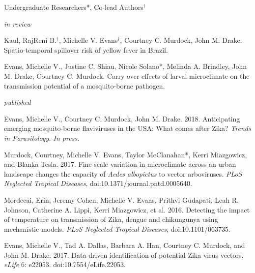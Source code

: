 


\bigskip
Undergraduate Researchers*, Co-lead Authors$^\dagger$

\smallskip
\textit{in review}
\smallskip

\begin{cvitems}

\item Kaul, RajReni B.$^\dagger$, \textcolor{awesome}{Michelle V. Evans}$^\dagger$, Courtney C. Murdock, John M. Drake. Spatio-temporal spillover risk of yellow fever in Brazil.
\smallskip

\item \textcolor{awesome}{Evans, Michelle V.}, Justine C. Shiau, Nicole Solano*, Melinda A. Brindley, John M. Drake, Courtney C. Murdock. Carry-over effects of larval microclimate on the transmission potential of a mosquito-borne pathogen.

\end{cvitems}

\bigskip
\textit{published}
\smallskip

\begin{etaremune}

\item \textcolor{awesome}{Evans, Michelle V.}, Courtney C. Murdock, John M. Drake. 2018. Anticipating emerging mosquito-borne flaviviruses in the USA: What comes after Zika? \textit{Trends in Parasitology. In press.}

\item Murdock, Courtney, \textcolor{awesome}{Michelle V. Evans}, Taylor McClanahan*, Kerri Miazgowicz, and Blanka Tesla. 2017. Fine-scale variation in microclimate across an urban landscape changes the capacity of \textit{Aedes albopictus} to vector arboviruses. \textit{PLoS Neglected Tropical Diseases}, doi:10.1371/journal.pntd.0005640.
\smallskip

\item Mordecai, Erin, Jeremy Cohen, \textcolor{awesome}{Michelle V. Evans}, Prithvi Gudapati, Leah R. Johnson, Catherine A. Lippi, Kerri Miazgowicz, et al. 2016. Detecting the impact of temperature on transmission of Zika, dengue and chikungunya using mechanistic models. \textit{PLoS Neglected Tropical Diseases}, doi:10.1101/063735.
\smallskip

\item \textcolor{awesome}{Evans, Michelle V.}, Tad A. Dallas, Barbara A. Han, Courtney C. Murdock, and John M. Drake. 2017. Data-driven identification of potential Zika virus vectors. \textit{eLife} 6: e22053. doi:10.7554/eLife.22053.
\end{etaremune}

\bigskip
